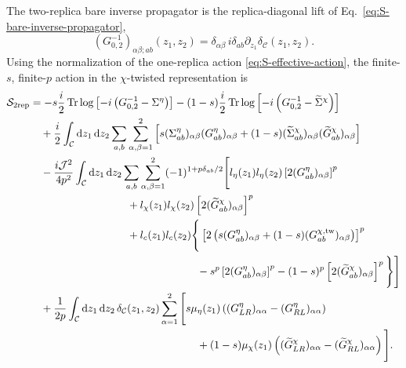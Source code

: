 \documentclass[11pt,a4paper]{article}
\begin{document}
The two-replica bare inverse propagator is the replica-diagonal lift of
Eq.~\eqref{eq:S-bare-inverse-propagator},
\begin{equation}
  (G_{0,2}^{-1})_{\alpha\beta;ab}(z_1,z_2)
  =
  \delta_{\alpha\beta}\,
  i\delta_{ab}\partial_{z_1}
  \delta_{\mathcal C}(z_1,z_2).
\label{eq:S5-bare-two-replica-propagator}
\end{equation}
Using the normalization of the one-replica action
\eqref{eq:S-effective-action}, the finite-\(s\), finite-\(p\) action in the
\(\chi\)-twisted representation is
\begin{equation}
\begin{aligned}
  \mathcal S_{\mathrm{2rep}}
  &=
  -s\frac{i}{2}
  \operatorname{Tr}\log
  \left[
  -i\left(G_{0,2}^{-1}-\Sigma^\eta\right)
  \right]
  -(1-s)\frac{i}{2}
  \operatorname{Tr}\log
  \left[
  -i\left(G_{0,2}^{-1}-\widetilde\Sigma^\chi\right)
  \right]
  \\
  &\quad
  +
  \frac{i}{2}
  \int_{\mathcal C}
  \mathrm dz_1\,\mathrm dz_2
  \sum_{a,b}
  \sum_{\alpha,\beta=1}^{2}
  \Big[
  s(\Sigma^\eta_{ab})_{\alpha\beta}
  (G^\eta_{ab})_{\alpha\beta}
  +
  (1-s)(\widetilde\Sigma^\chi_{ab})_{\alpha\beta}
  (\widetilde G^\chi_{ab})_{\alpha\beta}
  \Big]
  \\
  &\quad
  -
  \frac{i\mathcal J^2}{4p^2}
  \int_{\mathcal C}
  \mathrm dz_1\,\mathrm dz_2
  \sum_{a,b}
  \sum_{\alpha,\beta=1}^{2}
  (-1)^{1+p\delta_{ab}/2}
  \Bigg[
  l_\eta(z_1)l_\eta(z_2)
  \left[
  2(G^\eta_{ab})_{\alpha\beta}
  \right]^p
  \\
  &\hspace{3.2cm}
  +
  l_\chi(z_1)l_\chi(z_2)
  \left[
  2(\widetilde G^\chi_{ab})_{\alpha\beta}
  \right]^p
  \\
  &\hspace{3.2cm}
  +
  l_c(z_1)l_c(z_2)
  \Bigg\{
  \left[
  2\left(
  s(G^\eta_{ab})_{\alpha\beta}
  +
  (1-s)
  (G^{\chi,\mathrm{tw}}_{ab})_{\alpha\beta}
  \right)
  \right]^p
  \\
  &\hspace{5.5cm}
  -
  s^p
  \left[
  2(G^\eta_{ab})_{\alpha\beta}
  \right]^p
  -
  (1-s)^p
  \left[
  2(\widetilde G^\chi_{ab})_{\alpha\beta}
  \right]^p
  \Bigg\}
  \Bigg]
  \\
  &\quad
  +
  \frac{1}{2p}
  \int_{\mathcal C}
  \mathrm dz_1\,\mathrm dz_2\,
  \delta_{\mathcal C}(z_1,z_2)
  \sum_{\alpha=1}^{2}
  \Bigg[
  s\mu_\eta(z_1)
  \left(
  (G^\eta_{LR})_{\alpha\alpha}
  -
  (G^\eta_{RL})_{\alpha\alpha}
  \right)
  \\
  &\hspace{5.5cm}
  +
  (1-s)\mu_\chi(z_1)
  \left(
  (\widetilde G^\chi_{LR})_{\alpha\alpha}
  -
  (\widetilde G^\chi_{RL})_{\alpha\alpha}
  \right)
  \Bigg].
\end{aligned}
\label{eq:S5-two-replica-action}
\end{equation}
\end{document}
